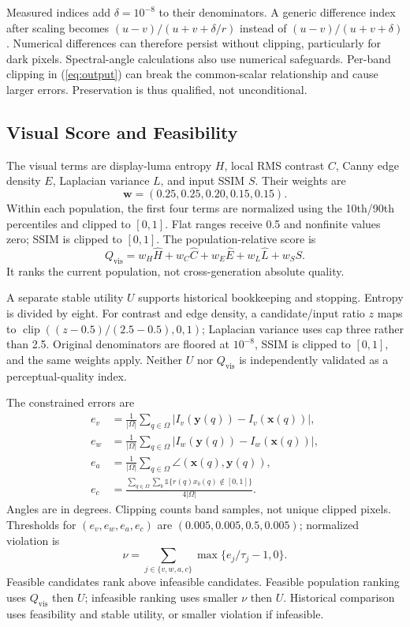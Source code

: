 \documentclass[conference]{IEEEtran}
\newcommand{\clip}{\operatorname{clip}}
\begin{document}
Measured indices add $\delta=10^{-8}$ to their denominators. A generic difference index after scaling becomes $(u-v)/(u+v+\delta/r)$ instead of $(u-v)/(u+v+\delta)$. Numerical differences can therefore persist without clipping, particularly for dark pixels. Spectral-angle calculations also use numerical safeguards. Per-band clipping in (\ref{eq:output}) can break the common-scalar relationship and cause larger errors. Preservation is thus qualified, not unconditional.

\subsection{Visual Score and Feasibility}
The visual terms are display-luma entropy $H$, local RMS contrast $C$, Canny edge density $E$, Laplacian variance $L$, and input SSIM $S$. Their weights are
\begin{equation}
\mathbf{w}=(0.25,0.25,0.20,0.15,0.15).
\end{equation}
Within each population, the first four terms are normalized using the 10th/90th percentiles and clipped to $[0,1]$. Flat ranges receive 0.5 and nonfinite values zero; SSIM is clipped to $[0,1]$. The population-relative score is
\begin{equation}
Q_{\mathrm{vis}}=w_H\widehat H+w_C\widehat C+w_E\widehat E
+w_L\widehat L+w_SS.
\end{equation}
It ranks the current population, not cross-generation absolute quality.

A separate stable utility $U$ supports historical bookkeeping and stopping. Entropy is divided by eight. For contrast and edge density, a candidate/input ratio $z$ maps to $\clip((z-0.5)/(2.5-0.5),0,1)$; Laplacian variance uses cap three rather than 2.5. Original denominators are floored at $10^{-8}$, SSIM is clipped to $[0,1]$, and the same weights apply. Neither $U$ nor $Q_{\mathrm{vis}}$ is independently validated as a perceptual-quality index.

The constrained errors are
\begin{align}
e_v&=\frac{1}{|\Omega|}\sum_{q\in\Omega}|I_v(\mathbf y(q))-I_v(\mathbf x(q))|,\\
e_w&=\frac{1}{|\Omega|}\sum_{q\in\Omega}|I_w(\mathbf y(q))-I_w(\mathbf x(q))|,\\
e_a&=\frac{1}{|\Omega|}\sum_{q\in\Omega}\angle(\mathbf x(q),\mathbf y(q)),\\
e_c&=\frac{\sum_{q\in\Omega}\sum_b\mathbb{1}\{r(q)x_b(q)\notin[0,1]\}}
{4|\Omega|}.
\end{align}
Angles are in degrees. Clipping counts band samples, not unique clipped pixels. Thresholds for $(e_v,e_w,e_a,e_c)$ are $(0.005,0.005,0.5,0.005)$; normalized violation is
\begin{equation}
\nu=\sum_{j\in\{v,w,a,c\}}\max\{e_j/\tau_j-1,0\}.
\end{equation}
Feasible candidates rank above infeasible candidates. Feasible population ranking uses $Q_{\mathrm{vis}}$ then $U$; infeasible ranking uses smaller $\nu$ then $U$. Historical comparison uses feasibility and stable utility, or smaller violation if infeasible.
\end{document}
